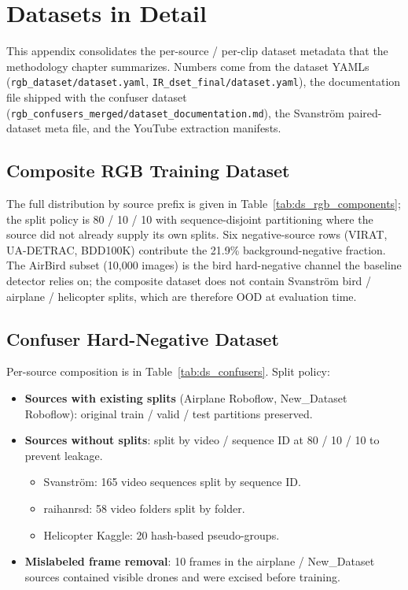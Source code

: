 \appendix

\chapter{Datasets in Detail}
\label{app:datasets}

This appendix consolidates the per-source / per-clip dataset metadata that the methodology chapter summarizes. Numbers come from the dataset YAMLs (\texttt{rgb\_dataset/\allowbreak dataset.yaml}, \texttt{IR\_dset\_final/\allowbreak dataset.yaml}), the documentation file shipped with the confuser dataset (\texttt{rgb\_confusers\_merged/\allowbreak dataset\_documentation.md}), the Svanstr\"om paired-dataset meta file, and the YouTube extraction manifests.

\section{Composite RGB Training Dataset}

The full distribution by source prefix is given in Table~\ref{tab:ds_rgb_components}; the split policy is 80 / 10 / 10 with sequence-disjoint partitioning where the source did not already supply its own splits. Six negative-source rows (VIRAT, UA-DETRAC, BDD100K) contribute the 21.9\% background-negative fraction. The AirBird subset (10{,}000 images) is the bird hard-negative channel the baseline detector relies on; the composite dataset does not contain Svanstr\"om bird / airplane / helicopter splits, which are therefore OOD at evaluation time.

\section{Confuser Hard-Negative Dataset}

Per-source composition is in Table~\ref{tab:ds_confusers}. Split policy:

\begin{itemize}
    \item \textbf{Sources with existing splits} (Airplane Roboflow, New\_Dataset Roboflow): original train / valid / test partitions preserved.
    \item \textbf{Sources without splits}: split by video / sequence ID at 80 / 10 / 10 to prevent leakage.
    \begin{itemize}
        \item Svanstr\"om: 165 video sequences split by sequence ID.
        \item raihanrsd: 58 video folders split by folder.
        \item Helicopter Kaggle: 20 hash-based pseudo-groups.
    \end{itemize}
    \item \textbf{Mislabeled frame removal}: 10 frames in the airplane / New\_Dataset sources contained visible drones and were excised before training.
\end{itemize}

